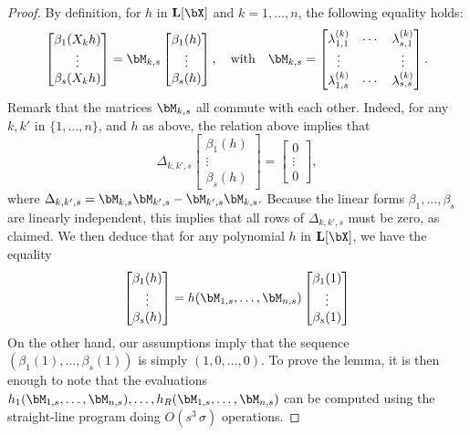 \documentclass[12pt]{article}
\begin{document}
\begin{proof}
  By definition, for $h$ in $\LL[\bX]$ and $k=1,\dots,n$, the following equality
  holds:
$$
  \begin{bmatrix}
    \beta_1(X_k h)\\
    \vdots\\
    \beta_s(X_k h)
  \end{bmatrix}=
\bM_{k,s}
  \begin{bmatrix}
    \beta_1(h)\\
    \vdots\\
    \beta_s(h)
  \end{bmatrix},
\quad\text{with}\quad
\bM_{k,s}= \begin{bmatrix}
    \lambda^{(k)}_{1,1} & \cdots & \lambda^{(k)}_{s,1}\\
    \vdots && \vdots \\
    \lambda^{(k)}_{1,s} & \cdots & \lambda^{(k)}_{s,s}
  \end{bmatrix}.
$$ 
 Remark that the matrices $\bM_{k,s}$ all commute with each other. Indeed, 
for any $k,k'$ in $\{1,\dots,n\}$, and $h$ as above, the relation above implies
that 
$$
\Delta_{k,k',s}
  \begin{bmatrix}
    \beta_1(h)\\
    \vdots\\
    \beta_s(h)
  \end{bmatrix} =
  \begin{bmatrix}
0\\ \vdots \\ 0 
  \end{bmatrix},
$$
where $\Delta_{k,k',s} = \bM_{k,s}\bM_{k',s}-\bM_{k',s}\bM_{k,s}.$ Because 
the linear forms $\beta_1,\dots,\beta_s$ are linearly independent, this implies
that all rows of $\Delta_{k,k',s}$ must be zero, as claimed.
We then deduce that for any polynomial $h$ in $\LL[\bX]$, we have
the equality
$$  \begin{bmatrix}
    \beta_1(h)\\
    \vdots\\
    \beta_s(h)
  \end{bmatrix} =
h(\bM_{1,s},\dots,\bM_{n,s})   \begin{bmatrix}
    \beta_1(1)\\
    \vdots\\
    \beta_s(1)
  \end{bmatrix} $$ On the other hand, our assumptions imply that the
  sequence $(\beta_1(1),\dots,\beta_s(1))$ is simply $(1,0,\dots,0)$.
  To prove the lemma, it is then enough to note that the evaluations \sloppy
  $h_1(\bM_{1,s},\dots,\bM_{n,s}),\dots,h_R(\bM_{1,s},\dots,\bM_{n,s})$
  can be computed using the straight-line program doing
  $O(s^3\,\sigma)$ operations.
\end{proof}
\end{document}
